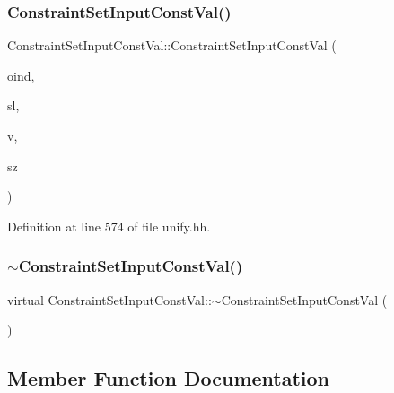 \subsubsection{\texorpdfstring{ConstraintSetInputConstVal()}{ConstraintSetInputConstVal()}}
{\footnotesize\ttfamily Constraint\+Set\+Input\+Const\+Val\+::\+Constraint\+Set\+Input\+Const\+Val (\begin{DoxyParamCaption}\item[{int4}]{oind,  }\item[{\mbox{\hyperlink{class_r_h_s_constant}{R\+H\+S\+Constant}} $\ast$}]{sl,  }\item[{\mbox{\hyperlink{class_r_h_s_constant}{R\+H\+S\+Constant}} $\ast$}]{v,  }\item[{\mbox{\hyperlink{class_r_h_s_constant}{R\+H\+S\+Constant}} $\ast$}]{sz }\end{DoxyParamCaption})\hspace{0.3cm}{\ttfamily [inline]}}



Definition at line 574 of file unify.\+hh.

\mbox{\label{class_constraint_set_input_const_val_aa9059ec1910d33b575a7004815be2b9d}} 
\subsubsection{\texorpdfstring{$\sim$ConstraintSetInputConstVal()}{~ConstraintSetInputConstVal()}}
{\footnotesize\ttfamily virtual Constraint\+Set\+Input\+Const\+Val\+::$\sim$\+Constraint\+Set\+Input\+Const\+Val (\begin{DoxyParamCaption}\item[{void}]{ }\end{DoxyParamCaption})\hspace{0.3cm}{\ttfamily [virtual]}}



\subsection{Member Function Documentation}
\mbox{\label{class_constraint_set_input_const_val_ae54d77177a810e4d67b9d5c528860645}} 
